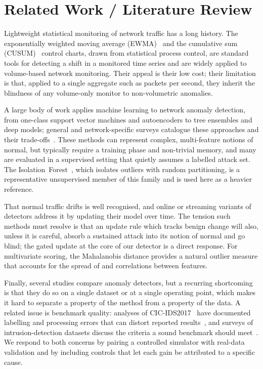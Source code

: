 \documentclass[11pt,a4paper]{article}
\begin{document}
\section{Related Work / Literature Review}
Lightweight statistical monitoring of network traffic has a long history. The
exponentially weighted moving average (EWMA)~\cite{roberts} and the cumulative
sum (CUSUM)~\cite{page} control charts, drawn from statistical process control,
are standard tools for detecting a shift in a monitored time series and are
widely applied to volume-based network monitoring. Their appeal is their low
cost; their limitation is that, applied to a single aggregate such as packets per
second, they inherit the blindness of any volume-only monitor to non-volumetric
anomalies.

A large body of work applies machine learning to network anomaly detection,
from one-class support vector machines and autoencoders to tree ensembles and
deep models; general and network-specific surveys catalogue these approaches and
their trade-offs~\cite{chandola,ahmed}. These methods can represent complex,
multi-feature notions of normal, but typically require a training phase and
non-trivial memory, and many are evaluated in a supervised setting that quietly
assumes a labelled attack set. The Isolation~Forest~\cite{isoforest}, which
isolates outliers with random partitioning, is a representative unsupervised
member of this family and is used here as a heavier reference.

That normal traffic drifts is well recognised, and online or streaming variants
of detectors address it by updating their model over time. The tension such
methods must resolve is that an update rule which tracks benign change will also,
unless it is careful, absorb a sustained attack into its notion of normal and go
blind; the gated update at the core of our detector is a direct response. For
multivariate scoring, the Mahalanobis distance provides a natural outlier measure
that accounts for the spread of and correlations between features.

Finally, several studies compare anomaly detectors, but a recurring shortcoming
is that they do so on a single dataset or at a single operating point, which makes
it hard to separate a property of the method from a property of the data. A
related issue is benchmark quality: analyses of CIC-IDS2017~\cite{cicids} have
documented labelling and processing errors that can distort reported
results~\cite{engelen}, and surveys of intrusion-detection datasets discuss the
criteria a sound benchmark should meet~\cite{ring}. We respond to both concerns by
pairing a controlled simulator with real-data validation and by including
controls that let each gain be attributed to a specific cause.
\end{document}
